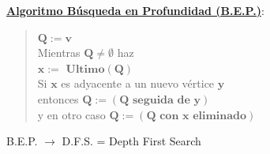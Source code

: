 \documentclass[twoside]{report}
\newcommand{\bs}[1]{\boldsymbol{#1}}
\begin{document}
\newpage
\noindent\underline{\textbf{Algoritmo B\'{u}squeda en Profundidad (B.E.P.)}}:

        \begin{quotation}
        \noindent $\bs{Q:=v}$\\[1ex]
        \textsf{Mientras} $\bs{Q\neq\emptyset}$ \textsf{haz}\\[1ex]
        \hspace*{5ex} $\bs{x:=\mbox{ Ultimo}(Q)}$\\[1ex]
        \hspace*{5ex} \textsf{Si} $\bs{x}$ es adyacente a un nuevo v\'{e}rtice $\bs{y}$\\[1ex]
        \hspace*{10ex} \textsf{entonces} $\bs{Q:=(Q\mbox{ seguida de }y)}$\\[1ex]
        \hspace*{10ex} \textsf{y en otro caso} $\bs{Q:=(Q\mbox{ con }x\mbox{ eliminado})}$
        \end{quotation}

\vspace{0.4cm}
        B.E.P. $\rightarrow$ D.F.S. = Depth First Search
%
\end{document}
